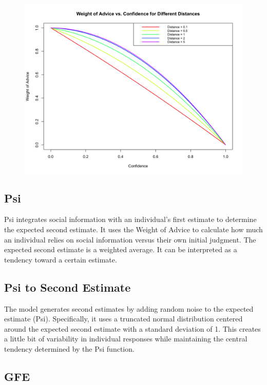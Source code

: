 \documentclass[
  man,floatsintext]{apa6}
\begin{document}
\begin{figure}[H]
\includegraphics[width=5.36in]{photos/woa} \caption{ }\label{fig:unnamed-chunk-4}
\end{figure}

\hypertarget{psi}{%
\subsection{Psi}\label{psi}}

Psi integrates social information with an individual's first estimate to determine the expected second estimate. It uses the Weight of Advice to calculate how much an individual relies on social information versus their own initial judgment. The expected second estimate is a weighted average. It can be interpreted as a tendency toward a certain estimate.

\hypertarget{psi-to-second-estimate}{%
\subsection{Psi to Second Estimate}\label{psi-to-second-estimate}}

The model generates second estimates by adding random noise to the expected estimate (Psi). Specifically, it uses a truncated normal distribution centered around the expected second estimate with a standard deviation of 1. This creates a little bit of variability in individual responses while maintaining the central tendency determined by the Psi function.

\hypertarget{gfe}{%
\subsection{GFE}\label{gfe}}
\end{document}
